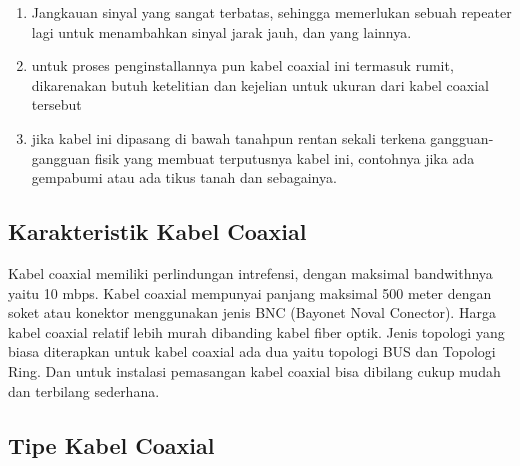 \begin{itemize}
\begin{itemize}
\begin{itemize}
\begin{enumerate}
					\item Jangkauan sinyal yang sangat terbatas, sehingga memerlukan sebuah repeater lagi untuk menambahkan sinyal jarak jauh, dan yang lainnya.
					\item untuk proses penginstallannya pun kabel coaxial ini termasuk rumit, dikarenakan butuh ketelitian dan kejelian untuk ukuran dari kabel coaxial tersebut
					\item jika kabel ini dipasang di bawah tanahpun rentan sekali terkena gangguan-gangguan fisik yang membuat terputusnya kabel ini, contohnya jika ada gempabumi atau ada tikus tanah dan sebagainya.
				\end{enumerate}
		\end{itemize}
	\subsection {Karakteristik Kabel Coaxial}
	Kabel coaxial memiliki perlindungan intrefensi, dengan maksimal bandwithnya yaitu 10 mbps. Kabel coaxial mempunyai panjang maksimal 500 meter dengan soket atau konektor menggunakan jenis BNC (Bayonet Noval Conector). Harga kabel coaxial relatif lebih murah dibanding kabel fiber optik. Jenis topologi yang biasa diterapkan untuk kabel coaxial ada dua yaitu topologi BUS dan Topologi Ring. Dan untuk instalasi pemasangan kabel coaxial bisa dibilang cukup mudah dan terbilang sederhana.
	
	\subsection{Tipe Kabel Coaxial}

\end{itemize}
\end{itemize}
